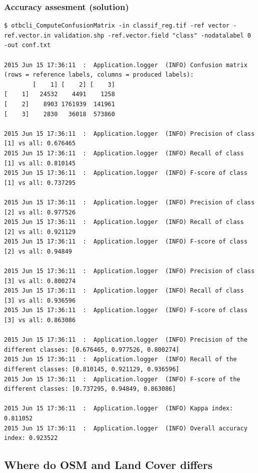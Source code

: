 \documentclass[8pt]{beamer}
\begin{document}
\begin{frame}[fragile]
\frametitle{Accuracy assesment (solution)}
\begin{scriptsize}
\begin{verbatim}
$ otbcli_ComputeConfusionMatrix -in classif_reg.tif -ref vector -ref.vector.in validation.shp -ref.vector.field "class" -nodatalabel 0 -out conf.txt

2015 Jun 15 17:36:11  :  Application.logger  (INFO) Confusion matrix (rows = reference labels, columns = produced labels):
        [    1] [    2] [    3] 
[    1]   24532    4491    1258 
[    2]    8903 1761939  141961 
[    3]    2830   36018  573860 

2015 Jun 15 17:36:11  :  Application.logger  (INFO) Precision of class [1] vs all: 0.676465
2015 Jun 15 17:36:11  :  Application.logger  (INFO) Recall of class [1] vs all: 0.810145
2015 Jun 15 17:36:11  :  Application.logger  (INFO) F-score of class [1] vs all: 0.737295

2015 Jun 15 17:36:11  :  Application.logger  (INFO) Precision of class [2] vs all: 0.977526
2015 Jun 15 17:36:11  :  Application.logger  (INFO) Recall of class [2] vs all: 0.921129
2015 Jun 15 17:36:11  :  Application.logger  (INFO) F-score of class [2] vs all: 0.94849

2015 Jun 15 17:36:11  :  Application.logger  (INFO) Precision of class [3] vs all: 0.800274
2015 Jun 15 17:36:11  :  Application.logger  (INFO) Recall of class [3] vs all: 0.936596
2015 Jun 15 17:36:11  :  Application.logger  (INFO) F-score of class [3] vs all: 0.863086

2015 Jun 15 17:36:11  :  Application.logger  (INFO) Precision of the different classes: [0.676465, 0.977526, 0.800274]
2015 Jun 15 17:36:11  :  Application.logger  (INFO) Recall of the different classes: [0.810145, 0.921129, 0.936596]
2015 Jun 15 17:36:11  :  Application.logger  (INFO) F-score of the different classes: [0.737295, 0.94849, 0.863086]

2015 Jun 15 17:36:11  :  Application.logger  (INFO) Kappa index: 0.811052
2015 Jun 15 17:36:11  :  Application.logger  (INFO) Overall accuracy index: 0.923522

\end{verbatim}
\end{scriptsize}

\end{frame}

\subsection{Where do OSM and Land Cover differs}
\end{document}
